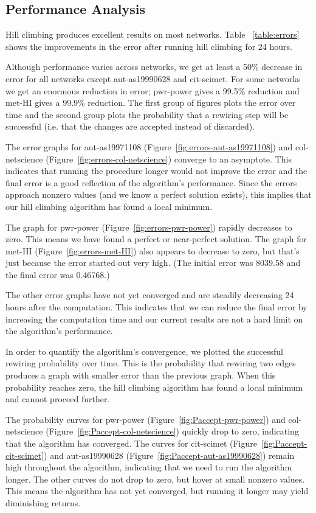\subsection{Performance Analysis}

Hill climbing produces excellent results on most networks.  Table ~\ref{table:errors} shows the improvements in the error after running hill climbing for 24 hours.

Although performance varies across networks, we get at least a 50\% decrease in error for all networks except aut-as19990628 and cit-scimet.  For some networks we get an enormous reduction in error; pwr-power gives a 99.5\% reduction and met-HI gives a 99.9\% reduction.  The first group of figures plots the error over time and the second group plots the probability that a rewiring step will be successful (i.e. that the changes are accepted instead of discarded).

The error graphs for aut-as19971108 (Figure~\ref{fig:errors-aut-as19971108}) and col-netscience (Figure~\ref{fig:errors-col-netscience}) converge to an asymptote.  This indicates that running the procedure longer would not improve the error and the final error is a good reflection of the algorithm's performance.  Since the errors approach nonzero values (and we know a perfect solution exists), this implies that our hill climbing algorithm has found a local minimum.

The graph for pwr-power (Figure~\ref{fig:errors-pwr-power}) rapidly decreases to zero.  This means we have found a perfect or near-perfect solution.  The graph for met-HI (Figure~\ref{fig:errors-met-HI}) also appears to decrease to zero, but that's just because the error started out very high.  (The initial error was 8039.58 and the final error was 0.46768.)

The other error graphs have not yet converged and are steadily decreasing 24 hours after the computation.  This indicates that we can reduce the final error by increasing the computation time and our current results are not a hard limit on the algorithm's performance.

In order to quantify the algorithm's convergence, we plotted the successful rewiring probability over time.  This is the probability that rewiring two edges produces a graph with smaller error than the previous graph.  When this probability reaches zero, the hill climbing algorithm has found a local minimum and cannot proceed further.

The probability curves for pwr-power (Figure~\ref{fig:Paccept-pwr-power}) and col-netscience (Figure~\ref{fig:Paccept-col-netscience}) quickly drop to zero, indicating that the algorithm has converged.  The curves for cit-scimet (Figure~\ref{fig:Paccept-cit-scimet}) and aut-as19990628 (Figure~\ref{fig:Paccept-aut-as19990628}) remain high throughout the algorithm, indicating that we need to run the algorithm longer.  The other curves do not drop to zero, but hover at small nonzero values.  This means the algorithm has not yet converged, but running it longer may yield diminishing returns.

